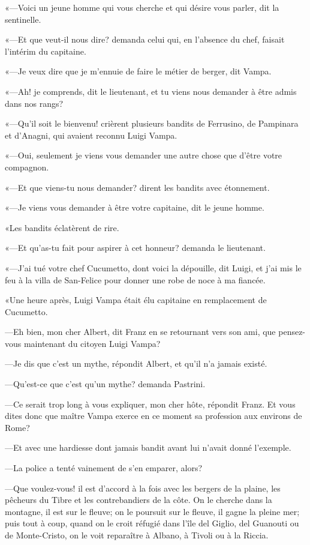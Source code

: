 «—Voici un jeune homme qui vous cherche et qui désire vous parler, dit la sentinelle. 

«—Et que veut-il nous dire? demanda celui qui, en l'absence du chef, faisait l'intérim du capitaine. 

«—Je veux dire que je m'ennuie de faire le métier de berger, dit Vampa. 

«—Ah! je comprends, dit le lieutenant, et tu viens nous demander à être admis dans nos rangs? 

«—Qu'il soit le bienvenu! crièrent plusieurs bandits de Ferrusino, de Pampinara et d'Anagni, qui avaient reconnu Luigi Vampa. 

«—Oui, seulement je viens vous demander une autre chose que d'être votre compagnon. 

«—Et que viens-tu nous demander? dirent les bandits avec étonnement. 

«—Je viens vous demander à être votre capitaine, dit le jeune homme. 

«Les bandits éclatèrent de rire. 

«—Et qu'as-tu fait pour aspirer à cet honneur? demanda le lieutenant.  

«—J'ai tué votre chef Cucumetto, dont voici la dépouille, dit Luigi, et j'ai mis le feu à la villa de San-Felice pour donner une robe de noce à ma fiancée. 

«Une heure après, Luigi Vampa était élu capitaine en remplacement de Cucumetto. 

—Eh bien, mon cher Albert, dit Franz en se retournant vers son ami, que pensez-vous maintenant du citoyen Luigi Vampa? 

—Je dis que c'est un mythe, répondit Albert, et qu'il n'a jamais existé. 

—Qu'est-ce que c'est qu'un mythe? demanda Pastrini. 

—Ce serait trop long à vous expliquer, mon cher hôte, répondit Franz. Et vous dites donc que maître Vampa exerce en ce moment sa profession aux environs de Rome? 

—Et avec une hardiesse dont jamais bandit avant lui n'avait donné l'exemple. 

—La police a tenté vainement de s'en emparer, alors? 

—Que voulez-vous! il est d'accord à la fois avec les bergers de la plaine, les pêcheurs du Tibre et les contrebandiers de la côte. On le cherche dans la montagne, il est sur le fleuve; on le poursuit sur le fleuve, il gagne la pleine mer; puis tout à coup, quand on le croit réfugié dans l'île del Giglio, del Guanouti ou de Monte-Cristo, on le voit reparaître à Albano, à Tivoli ou à la Riccia. 

